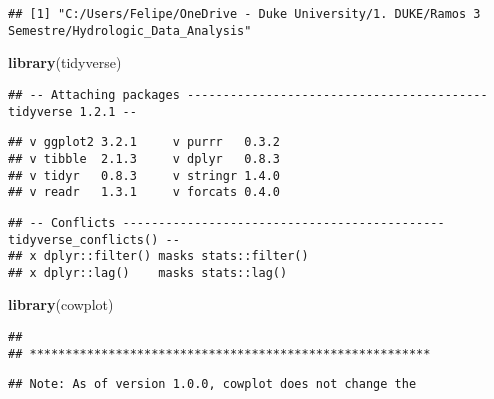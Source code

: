 \documentclass[]{article}
\newenvironment{Shaded}{\begin{snugshade}}{\end{snugshade}}
\newcommand{\CommentTok}[1]{\textcolor[rgb]{0.56,0.35,0.01}{\textit{#1}}}
\newcommand{\DataTypeTok}[1]{\textcolor[rgb]{0.13,0.29,0.53}{#1}}
\newcommand{\KeywordTok}[1]{\textcolor[rgb]{0.13,0.29,0.53}{\textbf{#1}}}
\newcommand{\NormalTok}[1]{#1}
\newcommand{\OperatorTok}[1]{\textcolor[rgb]{0.81,0.36,0.00}{\textbf{#1}}}
\newcommand{\OtherTok}[1]{\textcolor[rgb]{0.56,0.35,0.01}{#1}}
\begin{document}
\begin{Shaded}
\end{Shaded}

\begin{verbatim}
## [1] "C:/Users/Felipe/OneDrive - Duke University/1. DUKE/Ramos 3 Semestre/Hydrologic_Data_Analysis"
\end{verbatim}

\begin{Shaded}
\begin{Highlighting}[]
\KeywordTok{library}\NormalTok{(tidyverse)}
\end{Highlighting}
\end{Shaded}

\begin{verbatim}
## -- Attaching packages ------------------------------------------ tidyverse 1.2.1 --
\end{verbatim}

\begin{verbatim}
## v ggplot2 3.2.1     v purrr   0.3.2
## v tibble  2.1.3     v dplyr   0.8.3
## v tidyr   0.8.3     v stringr 1.4.0
## v readr   1.3.1     v forcats 0.4.0
\end{verbatim}

\begin{verbatim}
## -- Conflicts --------------------------------------------- tidyverse_conflicts() --
## x dplyr::filter() masks stats::filter()
## x dplyr::lag()    masks stats::lag()
\end{verbatim}

\begin{Shaded}
\begin{Highlighting}[]
\KeywordTok{library}\NormalTok{(cowplot)}
\end{Highlighting}
\end{Shaded}

\begin{verbatim}
## 
## ********************************************************
\end{verbatim}

\begin{verbatim}
## Note: As of version 1.0.0, cowplot does not change the
\end{verbatim}
\end{document}
